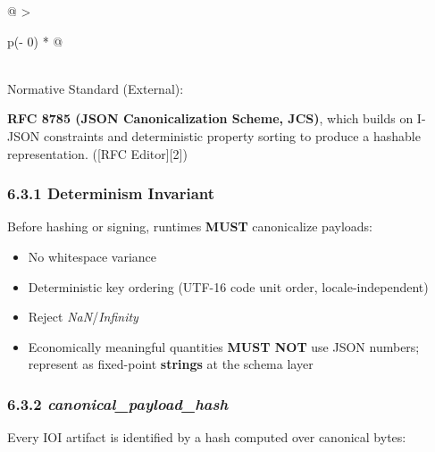 \documentclass[
  11pt,
]{article}
\providecommand{\tightlist}{%
  \setlength{\itemsep}{0pt}\setlength{\parskip}{0pt}}
\begin{document}
\begin{longtable}[]{@{}
  >{\raggedright\arraybackslash}p{(\columnwidth - 0\tabcolsep) * }@{}}
\toprule\noalign{}
 \\
\midrule\noalign{}
\endhead
\bottomrule\noalign{}
\endlastfoot
Normative Standard (External):

\textbf{RFC 8785 (JSON Canonicalization Scheme, JCS)}, which builds on
I-JSON constraints and deterministic property sorting to produce a
hashable representation. ({[}RFC Editor{]}{[}2{]}) \\
\end{longtable}

\hypertarget{determinism-invariant}{%
\subsubsection{6.3.1 Determinism
Invariant}\label{determinism-invariant}}

Before hashing or signing, runtimes \textbf{MUST} canonicalize payloads:

\begin{itemize}
\tightlist
\item
  No whitespace variance
\item
  Deterministic key ordering (UTF-16 code unit order,
  locale-independent)
\item
  Reject \emph{NaN}/\emph{Infinity}
\item
  Economically meaningful quantities \textbf{MUST NOT} use JSON numbers;
  represent as fixed-point \textbf{strings} at the schema layer
\end{itemize}

\hypertarget{canonical_payload_hash}{%
\subsubsection{\texorpdfstring{6.3.2
\emph{canonical\_payload\_hash}}{6.3.2 canonical\_payload\_hash}}\label{canonical_payload_hash}}

Every IOI artifact is identified by a hash computed over canonical
bytes:


\begin{center}
\end{center}
\end{document}
